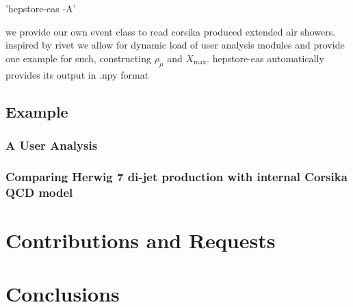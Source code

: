 \documentclass[aps,prd,11pt,tightenlines,superscriptaddress,nofootinbib,preprintnumbers,notitlepage]{revtex4-1}
\begin{document}
'hepstore-eas -A'

we provide our own event class to read corsika produced extended air showers. inspired by rivet we allow for dynamic load of user analysis modules and provide one example for such, constructing $\rho_\mu$ and $X_\text{max}$. hepstore-eas automatically provides its output in .npy format

\subsection{Example}

\subsubsection{A User Analysis}

\subsubsection{Comparing Herwig 7 di-jet production with internal Corsika QCD model}

\section{Contributions and Requests}

\section{Conclusions}
\end{document}
